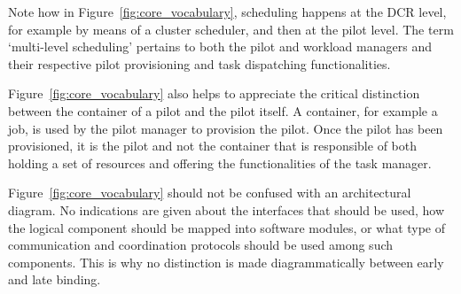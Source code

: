 \documentclass{sig-alternate}
\begin{document}

Note how in Figure~\ref{fig:core_vocabulary}, scheduling happens at the DCR
level, for example by means of a cluster scheduler, and then at the pilot level.
The term `multi-level scheduling' pertains to both the pilot and workload
managers and their respective pilot provisioning and task dispatching
functionalities. 

Figure~\ref{fig:core_vocabulary} also helps to appreciate the critical
distinction between the container of a pilot and the pilot itself. A container,
for example a job, is used by the pilot manager to provision the pilot. Once the
pilot has been provisioned, it is the pilot and not the container that is
responsible of both holding a set of resources and offering the functionalities
of the task manager.


Figure~\ref{fig:core_vocabulary} should not be confused with an architectural
diagram. No indications are given about the interfaces that should be used, how
the logical component should be mapped into software modules, or what type of
communication and coordination protocols should be used among such components.
This is why no distinction is made diagrammatically between early and late
binding.

\end{document}
